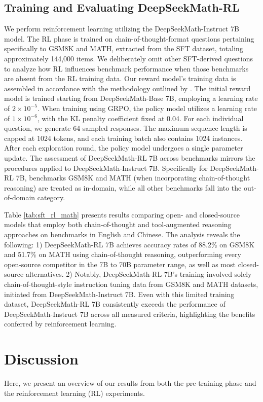 \subsection{Training and Evaluating DeepSeekMath-RL}

We perform reinforcement learning utilizing the DeepSeekMath-Instruct 7B model. The RL phase is trained on chain-of-thought-format questions pertaining specifically to GSM8K and MATH, extracted from the SFT dataset, totaling approximately 144,000 items. We deliberately omit other SFT-derived questions to analyze how RL influences benchmark performance when those benchmarks are absent from the RL training data. Our reward model's training data is assembled in accordance with the methodology outlined by \citep{wang2023math}. The initial reward model is trained starting from DeepSeekMath-Base 7B, employing a learning rate of $2 \times 10^{-5}$. When training using GRPO, the policy model utilizes a learning rate of $1 \times 10^{-6}$, with the KL penalty coefficient fixed at 0.04. For each individual question, we generate 64 sampled responses. The maximum sequence length is capped at 1024 tokens, and each training batch also contains 1024 instances. After each exploration round, the policy model undergoes a single parameter update. The assessment of DeepSeekMath-RL 7B across benchmarks mirrors the procedures applied to DeepSeekMath-Instruct 7B. Specifically for DeepSeekMath-RL 7B, benchmarks GSM8K and MATH (when incorporating chain-of-thought reasoning) are treated as in-domain, while all other benchmarks fall into the out-of-domain category.

Table \ref{tab:sft_rl_math} presents results comparing open- and closed-source models that employ both chain-of-thought and tool-augmented reasoning approaches on benchmarks in English and Chinese. The analysis reveals the following: 1) DeepSeekMath-RL 7B achieves accuracy rates of 88.2\% on GSM8K and 51.7\% on MATH using chain-of-thought reasoning, outperforming every open-source competitor in the 7B to 70B parameter range, as well as most closed-source alternatives. 2) Notably, DeepSeekMath-RL 7B’s training involved solely chain-of-thought-style instruction tuning data from GSM8K and MATH datasets, initiated from DeepSeekMath-Instruct 7B. Even with this limited training dataset, DeepSeekMath-RL 7B consistently exceeds the performance of DeepSeekMath-Instruct 7B across all measured criteria, highlighting the benefits conferred by reinforcement learning.

\section{Discussion}
Here, we present an overview of our results from both the pre-training phase and the reinforcement learning (RL) experiments.

